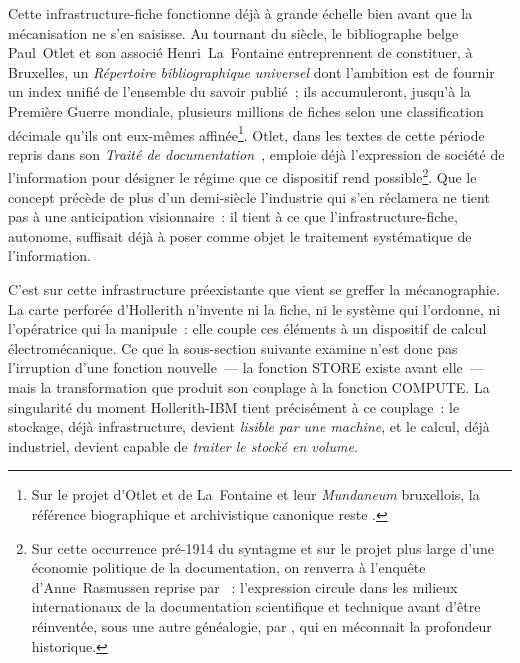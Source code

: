 %
Cette infrastructure-fiche fonctionne déjà à grande échelle bien avant que la mécanisation ne s'en saisisse. Au tournant du siècle, le bibliographe belge Paul~Otlet et son associé Henri~La~Fontaine entreprennent de constituer, à Bruxelles, un \emph{Répertoire bibliographique universel} dont l'ambition est de fournir un index unifié de l'ensemble du savoir publié~; ils accumuleront, jusqu'à la Première Guerre mondiale, plusieurs millions de fiches selon une classification décimale qu'ils ont eux-mêmes affinée\footnote{Sur le projet d'Otlet et de La~Fontaine et leur \emph{Mundaneum} bruxellois, la référence biographique et archivistique canonique reste \textcite{rayward_universe_1975}.}. Otlet, dans les textes de cette période repris dans son \emph{Traité de documentation}~\parencite{otlet_traite_1934}, emploie déjà l'expression de \og société de l'information\fg{} pour désigner le régime que ce dispositif rend possible\footnote{Sur cette occurrence pré-1914 du syntagme et sur le projet plus large d'une économie politique de la documentation, on renverra à l'enquête d'Anne~Rasmussen reprise par \textcite[ch.~7]{gardey_ecrire_2008}~: l'expression circule dans les milieux internationaux de la documentation scientifique et technique avant d'être réinventée, sous une autre généalogie, par \textcite{machlup_production_1962}, qui en méconnait la profondeur historique.}. Que le concept précède de plus d'un demi-siècle l'industrie qui s'en réclamera ne tient pas à une anticipation visionnaire~: il tient à ce que l'infrastructure-fiche, autonome, suffisait déjà à poser comme objet le traitement systématique de l'information.

C'est sur cette infrastructure préexistante que vient se greffer la mécanographie. La carte perforée d'Hollerith n'invente ni la fiche, ni le système qui l'ordonne, ni l'opératrice qui la manipule~: elle couple ces éléments à un dispositif de calcul électromécanique. Ce que la sous-section suivante examine n'est donc pas l'irruption d'une fonction nouvelle~--- la fonction STORE existe avant elle~--- mais la transformation que produit son couplage à la fonction COMPUTE. La singularité du moment Hollerith-IBM tient précisément à ce couplage~: le stockage, déjà infrastructure, devient \emph{lisible par une machine}, et le calcul, déjà industriel, devient capable de \emph{traiter le stocké en volume}.



